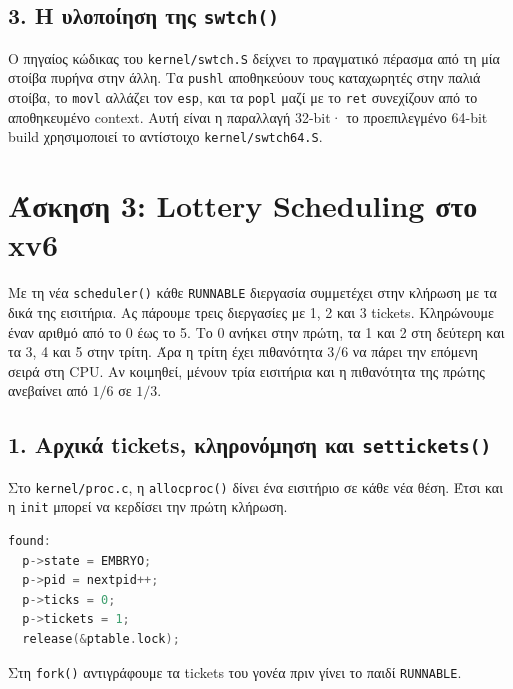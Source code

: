 \documentclass[11pt,a4paper]{article}
\begin{document}
\subsection*{3. Η υλοποίηση της \texttt{swtch()}}
Ο πηγαίος κώδικας του \texttt{kernel/swtch.S} δείχνει το πραγματικό πέρασμα από τη μία στοίβα πυρήνα στην άλλη. Τα \texttt{pushl} αποθηκεύουν τους καταχωρητές στην παλιά στοίβα, το \texttt{movl} αλλάζει τον \texttt{esp}, και τα \texttt{popl} μαζί με το \texttt{ret} συνεχίζουν από το αποθηκευμένο context. Αυτή είναι η παραλλαγή 32-bit· το προεπιλεγμένο 64-bit build χρησιμοποιεί το αντίστοιχο \texttt{kernel/swtch64.S}.



\clearpage
\section{Άσκηση 3: Lottery Scheduling στο xv6}

Με τη νέα \texttt{scheduler()} κάθε \texttt{RUNNABLE} διεργασία συμμετέχει στην κλήρωση με τα δικά της εισιτήρια. Ας πάρουμε τρεις διεργασίες με 1, 2 και 3 tickets. Κληρώνουμε έναν αριθμό από το 0 έως το 5. Το 0 ανήκει στην πρώτη, τα 1 και 2 στη δεύτερη και τα 3, 4 και 5 στην τρίτη. Άρα η τρίτη έχει πιθανότητα $3/6$ να πάρει την επόμενη σειρά στη CPU. Αν κοιμηθεί, μένουν τρία εισιτήρια και η πιθανότητα της πρώτης ανεβαίνει από $1/6$ σε $1/3$.

\subsection*{1. Αρχικά tickets, κληρονόμηση και \texttt{settickets()}}
Στο \texttt{kernel/proc.c}, η \texttt{allocproc()} δίνει ένα εισιτήριο σε κάθε νέα θέση. Έτσι και η \texttt{init} μπορεί να κερδίσει την πρώτη κλήρωση.

\begin{lstlisting}[language=C,firstnumber=42,basicstyle=\ttfamily\scriptsize,lineskip=-0.7pt]
found:
  p->state = EMBRYO;
  p->pid = nextpid++;
  p->ticks = 0;
  p->tickets = 1;
  release(&ptable.lock);
\end{lstlisting}
Στη \texttt{fork()} αντιγράφουμε τα tickets του γονέα πριν γίνει το παιδί \texttt{RUNNABLE}.
\end{document}
